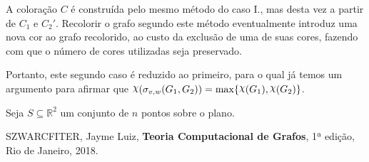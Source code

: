 \documentclass{homework}
\begin{document}
\begin{enumerate}[label=\Roman*.]
		A coloração $C$ é construída pelo mesmo método do caso {I.}, mas desta vez a partir de $C_1$ e $C_2'$. Recolorir o grafo segundo este método eventualmente introduz uma nova cor ao grafo recolorido, ao custo da exclusão de uma de suas cores, fazendo com que o número de cores utilizadas seja preservado.\par
		
		Portanto, este segundo caso é reduzido ao primeiro, para o qual já temos um argumento para afirmar que $\rchi(\sigma_{v, w}(G_1, G_2)) = \max \{\rchi(G_1), \rchi(G_2)\}$. \par
		
	\end{enumerate}
	
	\quest Seja $S \subseteq \mathbb{R}^2$ um conjunto de $n$ pontos sobre o plano.
	
	
	
	
	
	
	\begin{thebibliography}{10}
		 SZWARCFITER, Jayme Luiz, \textbf{Teoria Computacional de Grafos}, 1ª edição, Rio de Janeiro, 2018.
	\end{thebibliography}
	
\end{document}
